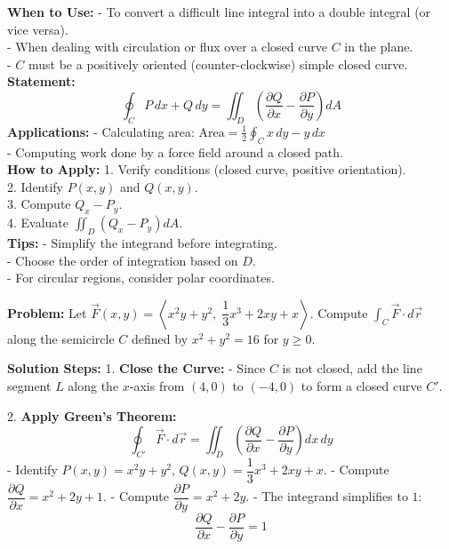\documentclass[9pt]{article}
\begin{document}
\begin{multicols}{2}
\begin{tcolorbox}[title=\textbf{Green's Theorem}, colframe=lightgreen]
\textbf{When to Use:}
- To convert a difficult line integral into a double integral (or vice versa). \\
- When dealing with circulation or flux over a closed curve \( C \) in the plane. \\
- \( C \) must be a positively oriented (counter-clockwise) simple closed curve. \\
\textbf{Statement:}
\[ \oint_C P\,dx + Q\,dy = \iint_D \left( \frac{\partial Q}{\partial x} - \frac{\partial P}{\partial y} \right) dA \]
\textbf{Applications:}
- Calculating area: \( \text{Area} = \frac{1}{2} \oint_C x\, dy - y\, dx \) \\
- Computing work done by a force field around a closed path. \\
\textbf{How to Apply:}
1. Verify conditions (closed curve, positive orientation). \\
2. Identify \( P(x, y) \) and \( Q(x, y) \). \\
3. Compute \( Q_x - P_y \). \\
4. Evaluate \( \iint_D (Q_x - P_y) dA \). \\
\textbf{Tips:}
- Simplify the integrand before integrating. \\
- Choose the order of integration based on \( D \). \\
- For circular regions, consider polar coordinates.
\end{tcolorbox}

\begin{tcolorbox}[title=\textbf{Example: Evaluating a Line Integral Using Green's Theorem}, colframe=lightpink]
   \textbf{Problem:} Let \( \vec{F}(x, y) = \left\langle x^2 y + y^2,\; \dfrac{1}{3} x^3 + 2 x y + x \right\rangle \). Compute \( \displaystyle \int_C \vec{F} \cdot d\vec{r} \) along the semicircle \( C \) defined by \( x^2 + y^2 = 16 \) for \( y \geq 0 \).
   
   \textbf{Solution Steps:}
   1. \textbf{Close the Curve:}
      - Since \( C \) is not closed, add the line segment \( L \) along the \( x \)-axis from \( (4, 0) \) to \( (-4, 0) \) to form a closed curve \( C' \).
   
   2. \textbf{Apply Green's Theorem:}
      \[ \oint_{C'} \vec{F} \cdot d\vec{r} = \iint_D \left( \frac{\partial Q}{\partial x} - \frac{\partial P}{\partial y} \right) dx\, dy \]
      - Identify \( P(x, y) = x^2 y + y^2 \), \( Q(x, y) = \dfrac{1}{3} x^3 + 2 x y + x \).
      - Compute \( \dfrac{\partial Q}{\partial x} = x^2 + 2 y + 1 \).
      - Compute \( \dfrac{\partial P}{\partial y} = x^2 + 2 y \).
      - The integrand simplifies to \( 1 \):
        \[ \dfrac{\partial Q}{\partial x} - \dfrac{\partial P}{\partial y} = 1 \]
   

\end{tcolorbox}
\end{multicols}
\end{document}
